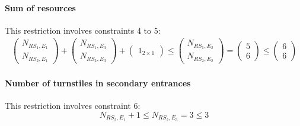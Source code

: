 \paragraph{Sum of resources}
This restriction involves constraints 4 to 5:
\begin{equation}
    \begin{aligned}
        \begin{pmatrix}
            N_{RS_1,E_1}\\
            N_{RS_2,E_1}
        \end{pmatrix}
        +
        \begin{pmatrix}
            N_{RS_1,E_3}\\
            N_{RS_2,E_3}
        \end{pmatrix}
        +
        \begin{pmatrix}
            1_{2 \times 1}
        \end{pmatrix}
        \leq
        \begin{pmatrix}
            N_{RS_1,E_2}\\
            N_{RS_2,E_2}
        \end{pmatrix}
        =
        \begin{pmatrix}
            5\\
            6
        \end{pmatrix}
        \leq
        \begin{pmatrix}
            6\\
            6
        \end{pmatrix}
    \end{aligned}   
\end{equation}

\paragraph{Number of turnstiles in secondary entrances}
This restriction involves constraint 6:
\begin{equation}
    N_{RS_2,E_1} + 1 \leq N_{RS_2,E_3} = 3 \leq 3
\end{equation}

